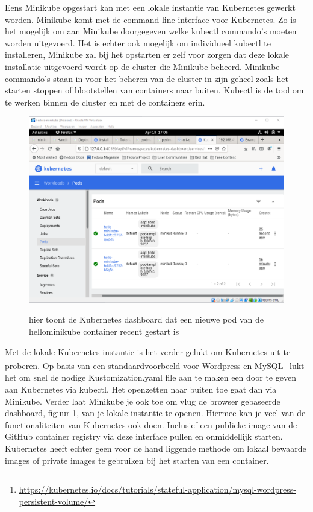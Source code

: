 Eens Minikube opgestart kan met een lokale instantie van Kubernetes gewerkt worden. Minikube komt met de command line interface voor Kubernetes. Zo is het mogelijk om aan Minikube doorgegeven welke kubectl commando’s moeten worden uitgevoerd. Het is echter ook mogelijk om individueel kubectl te installeren, Minikube zal bij het opstarten er zelf voor zorgen dat deze lokale installatie uitgevoerd wordt op de cluster die Minikube beheerd.  Minikube commando’s staan in voor het beheren van de cluster in zijn geheel zoals het starten stoppen of blootstellen van containers naar buiten. Kubectl is de tool om te werken binnen de cluster en met de containers erin.
\begin{figure}[h]
    \includegraphics[width=\linewidth]{img/kubenetesDash.png}
    \label{fig:kubenetesDash}
    \caption[the kubenetes Dashboard]{hier toont de Kubernetes dashboard dat een nieuwe pod van de hellominikube container recent gestart is}
    \centering
\end{figure}

Met de lokale Kubernetes instantie is het verder gelukt om Kubernetes uit te proberen. Op basis van een standaardvoorbeeld voor Wordpress en MySQL\footnote{\url{https://kubernetes.io/docs/tutorials/stateful-application/mysql-wordpress-persistent-volume/}}  lukt het om snel de nodige Kustomization.yaml file aan te maken een door te geven aan Kubernetes via kubectl. Het openzetten naar buiten toe gaat dan via Minikube. Verder laat Minikube je ook toe om vlug de browser gebaseerde dashboard, figuur \ref{fig:kubenetesDash}, van je lokale instantie te openen. Hiermee kan je veel van de functionaliteiten van Kubernetes ook doen. Inclusief een publieke image van de GitHub container registry via deze interface pullen en onmiddellijk starten. Kubernetes heeft echter geen voor de hand liggende methode om lokaal bewaarde images of private images te gebruiken bij het starten van een container.

